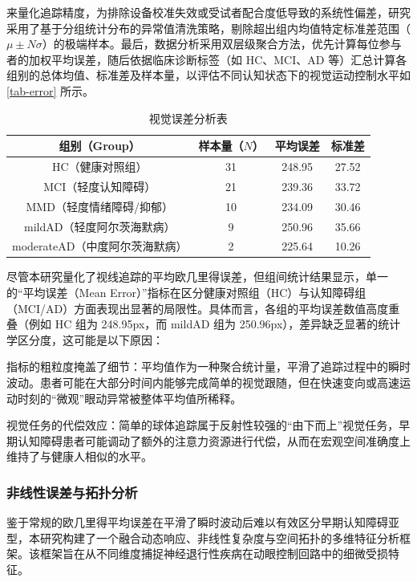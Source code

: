 \documentclass[12pt,hyperref,a4paper,UTF8]{ctexart}
\begin{document}
来量化追踪精度，为排除设备校准失效或受试者配合度低导致的系统性偏差，研究采用了基于分组统计分布的异常值清洗策略，剔除超出组内均值特定标准差范围（$\mu\pm N\sigma$）的极端样本。最后，数据分析采用双层级聚合方法，优先计算每位参与者的加权平均误差，随后依据临床诊断标签（如 HC、MCI、AD 等）汇总计算各组别的总体均值、标准差及样本量，以评估不同认知状态下的视觉运动控制水平如\autoref{tab-error} 所示。

\begin{table}[htbp]
    \centering
    \setlength{\tabcolsep}{16pt}
    \renewcommand{\arraystretch}{1.2}
    \caption{视觉误差分析表}\label{tab-error}
    \begin{tabular}{cccc}
        \bottomrule[1.5pt]
        组别（Group） & 样本量（$N$） & 平均误差 & 标准差 \\
        \midrule[0.75pt]
        HC（健康对照组） & 31 & 248.95 & 27.52 \\
        MCI（轻度认知障碍） & 21 & 239.36 & 33.72 \\
        MMD（轻度情绪障碍/抑郁） & 10 & 234.09 & 30.46 \\
        mildAD（轻度阿尔茨海默病） & 9 & 250.96 & 35.66 \\
        moderateAD（中度阿尔茨海默病） & 2 & 225.64 & 10.26 \\
        \toprule[1.5pt]
    \end{tabular}
\end{table}

尽管本研究量化了视线追踪的平均欧几里得误差，但组间统计结果显示，单一的“平均误差（Mean Error）”指标在区分健康对照组（HC）与认知障碍组（MCI/AD）方面表现出显著的局限性。具体而言，各组的平均误差数值高度重叠（例如 HC 组为 248.95px，而 mildAD 组为 250.96px），差异缺乏显著的统计学区分度，这可能是以下原因：

指标的粗粒度掩盖了细节：平均值作为一种聚合统计量，平滑了追踪过程中的瞬时波动。患者可能在大部分时间内能够完成简单的视觉跟随，但在快速变向或高速运动时刻的“微观”眼动异常被整体平均值所稀释。

视觉任务的代偿效应：简单的球体追踪属于反射性较强的“由下而上”视觉任务，早期认知障碍患者可能调动了额外的注意力资源进行代偿，从而在宏观空间准确度上维持了与健康人相似的水平。



\subsubsection{非线性误差与拓扑分析}
鉴于常规的欧几里得平均误差在平滑了瞬时波动后难以有效区分早期认知障碍亚型，本研究构建了一个融合动态响应、非线性复杂度与空间拓扑的多维特征分析框架。该框架旨在从不同维度捕捉神经退行性疾病在动眼控制回路中的细微受损特征。
\end{document}
